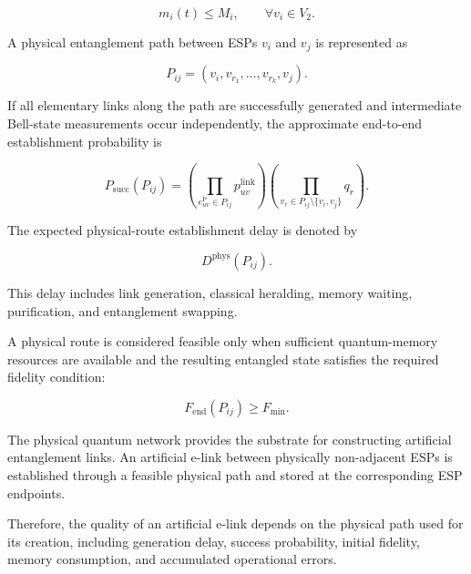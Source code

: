 \begin{equation}
    m_i(t)
    \leq
    M_i,
    \qquad
    \forall v_i\in V_2 .
\end{equation}

A physical entanglement path between ESPs $v_i$ and $v_j$ is represented as

\begin{equation}
    P_{ij}
    =
    \left(
    v_i,
    v_{r_1},
    \ldots,
    v_{r_k},
    v_j
    \right).
\end{equation}

If all elementary links along the path are successfully generated and intermediate Bell-state measurements occur independently, the approximate end-to-end establishment probability is

\begin{equation}
    P_{\mathrm{succ}}
    \left(
    P_{ij}
    \right)
    =
    \left(
    \prod_{e_{uv}^{\mathrm{P}}\in P_{ij}}
    p_{uv}^{\mathrm{link}}
    \right)
    \left(
    \prod_{v_r\in P_{ij}\setminus\{v_i,v_j\}}
    q_r
    \right).
\end{equation}

The expected physical-route establishment delay is denoted by

\begin{equation}
    D^{\mathrm{phys}}
    \left(
    P_{ij}
    \right).
\end{equation}

This delay includes link generation, classical heralding, memory waiting,
purification, and entanglement swapping.

A physical route is considered feasible only when sufficient quantum-memory resources are available and the resulting entangled state satisfies the required fidelity condition:

\begin{equation}
    F_{\mathrm{end}}
    \left(
    P_{ij}
    \right)
    \geq
    F_{\min}.
\end{equation}

The physical quantum network provides the substrate for constructing artificial entanglement links. An artificial e-link between physically non-adjacent ESPs is established through a feasible physical path and stored at the corresponding ESP endpoints.

Therefore, the quality of an artificial e-link depends on the physical path used for its creation, including generation delay, success probability, initial fidelity, memory consumption, and accumulated operational errors.
